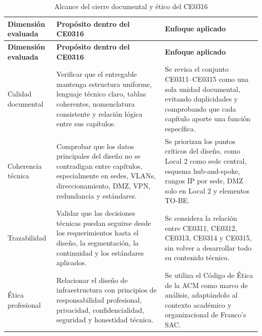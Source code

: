 \documentclass[11pt, a4paper, oneside]{report}
\begin{document}
\begin{xltabular}{\textwidth}{@{}|L{3.2cm}|X|X|@{}}
\caption{Alcance del cierre documental y ético del CE0316}
\label{tab:alcance_cierre_documental_etico} \\

\parbox[c][1.1cm][c]{\linewidth}{\centering\color{white}\bfseries\small Dimensión evaluada} &
\parbox[c][1.1cm][c]{\linewidth}{\centering\color{white}\bfseries\small Propósito dentro del CE0316} &
\parbox[c][1.1cm][c]{\linewidth}{\centering\color{white}\bfseries\small Enfoque aplicado} \\ \hline
\endfirsthead

\parbox[c][1.1cm][c]{\linewidth}{\centering\color{white}\bfseries\small Dimensión evaluada} &
\parbox[c][1.1cm][c]{\linewidth}{\centering\color{white}\bfseries\small Propósito dentro del CE0316} &
\parbox[c][1.1cm][c]{\linewidth}{\centering\color{white}\bfseries\small Enfoque aplicado} \\ \hline
\endhead

\hline
\endfoot

{\small Calidad documental} &
{\small Verificar que el entregable mantenga estructura uniforme, lenguaje técnico claro, tablas coherentes, nomenclatura consistente y relación lógica entre sus capítulos.} &
{\small Se revisa el conjunto CE0311--CE0315 como una sola unidad documental, evitando duplicidades y comprobando que cada capítulo aporte una función específica.} \\ \hline

{\small Coherencia técnica} &
{\small Comprobar que los datos principales del diseño no se contradigan entre capítulos, especialmente en sedes, VLANs, direccionamiento, DMZ, VPN, redundancia y estándares.} &
{\small Se priorizan los puntos críticos del diseño, como Local 2 como sede central, esquema hub-and-spoke, rangos IP por sede, DMZ solo en Local 2 y elementos TO-BE.} \\ \hline

{\small Trazabilidad} &
{\small Validar que las decisiones técnicas puedan seguirse desde los requerimientos hasta el diseño, la segmentación, la continuidad y los estándares aplicados.} &
{\small Se considera la relación entre CE0311, CE0312, CE0313, CE0314 y CE0315, sin volver a desarrollar todo su contenido técnico.} \\ \hline

{\small Ética profesional} &
{\small Relacionar el diseño de infraestructura con principios de responsabilidad profesional, privacidad, confidencialidad, seguridad y honestidad técnica.} &
{\small Se utiliza el Código de Ética de la ACM como marco de análisis, adaptándolo al contexto académico y organizacional de Franco's SAC.} \\ \hline


\end{xltabular}
\end{document}
